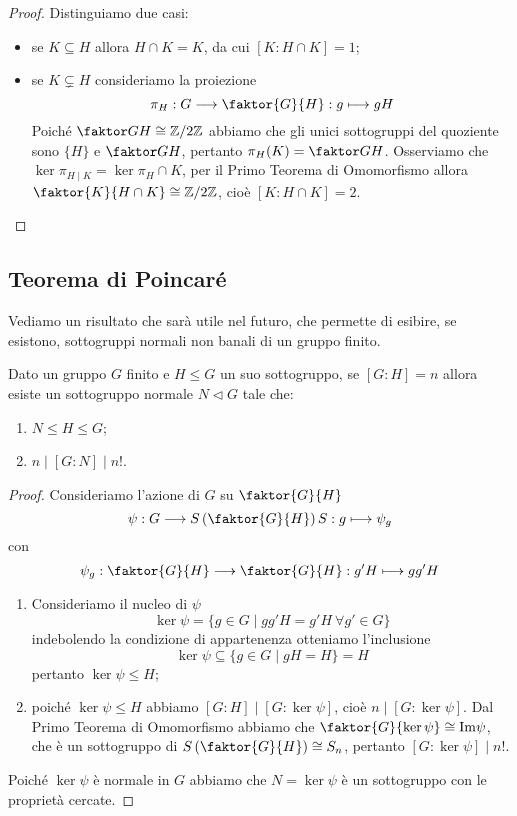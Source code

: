 \documentclass[11pt]{scrartcl}
\begin{document}
\begin{proof}
    Distinguiamo due casi:
    \begin{itemize}
        \item se $K \subseteq H$ allora $H \cap K = K$, da cui $[K:H\cap K] = 1$;
        \item se $K \subsetneq H$ consideriamo la proiezione 
        \[
            \pi_H: G\longrightarrow \faktor{G}{H} :g \longmapsto gH
        \]
        Poiché $\faktor G H \cong \Z2$ abbiamo che gli unici sottogruppi 
        del quoziente sono $\{H\}$ e $\faktor G H$, pertanto 
        $\pi_H(K) = \faktor G H$. Osserviamo che $\ker\pi_{H\mid K}
        = \ker \pi_H \cap K$, per il Primo Teorema di Omomorfismo allora 
        $\faktor{K}{H\cap K} \cong \Z2$, cioè $[K:H\cap K] = 2$.
    \end{itemize}
\end{proof}

\subsection{Teorema di Poincaré}

Vediamo un risultato che sarà utile nel futuro, che permette di esibire,
se esistono, sottogruppi normali non banali di un gruppo finito.

\begin{theorem}
    Dato un gruppo $G$ finito e $H\leqslant G$ un suo sottogruppo, 
    se $[G:H] = n$ allora esiste un sottogruppo normale $N\triangleleft G$ 
    tale che:
    \begin{enumerate}[(1)]
        \item $N\leqslant H \leqslant G$;
        \item $n \mid [G:N] \mid n!$.
    \end{enumerate}
\end{theorem}

\begin{proof}
    Consideriamo l'azione di $G$ su $\faktor{G}{H}$
    \[
        \psi: G\longrightarrow S\left(\faktor{G}{H}\right)S:g\longmapsto \psi_g
    \]
    con
    \[
        \psi_g:\faktor{G}{H}\longrightarrow\faktor{G}{H} : g'H\longmapsto gg'H
    \]
    \begin{enumerate}[(1)]
        \item Consideriamo il nucleo di $\psi$
        \[
            \ker\psi = \{g \in G\mid gg'H = g'H~\forall g' \in G\}
        \]indebolendo la condizione di appartenenza otteniamo l'inclusione
        \[
            \ker\psi \subseteq \{g \in G \mid gH = H\} = H
        \]pertanto $\ker\psi \leqslant H$;
        \item poiché $\ker\psi \leqslant H$ abbiamo $[G:H]\mid [G:\ker\psi]$, cioè
        $n \mid [G:\ker\psi]$. Dal Primo Teorema di Omomorfismo abbiamo che
        $\faktor{G}{\ker\psi} \cong \mathrm{Im\psi}$, che è un sottogruppo
        di $S\left(\faktor{G}{H}\right)\cong S_n$, pertanto $[G:\ker\psi]\mid n!$.
    \end{enumerate}
    Poiché $\ker\psi$ è normale in $G$ abbiamo che $N = \ker\psi$ è un sottogruppo
    con le proprietà cercate.
\end{proof}
\end{document}
